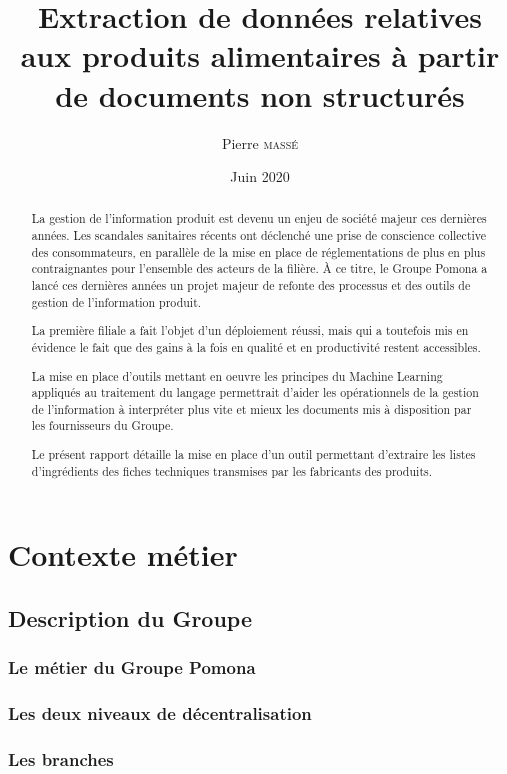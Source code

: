 \documentclass{report}
\title{Extraction de données relatives aux produits alimentaires à partir de documents non structurés}
\author{Pierre \textsc{massé}}
\date{Juin 2020}
\begin{document}
\maketitle

\large
\begin{abstract}
    {\em
    
    La gestion de l'information produit est devenu un enjeu de société majeur ces dernières années.
    Les scandales sanitaires récents ont déclenché une prise de conscience collective des consommateurs, en parallèle de la mise en place de réglementations de plus en plus contraignantes pour l'ensemble des acteurs de la filière\cite{incotext}\cite{incoexpl}.
    \`{A} ce titre, le Groupe Pomona a lancé ces dernières années un projet majeur de refonte des processus et des outils de gestion de l'information produit.

    La première filiale a fait l'objet d'un déploiement réussi, mais qui a toutefois mis en évidence le fait que des gains à la fois en qualité et en productivité restent accessibles.

    La mise en place d'outils mettant en oeuvre les principes du Machine Learning appliqués au traitement du langage permettrait d'aider les opérationnels de la gestion de l'information à interpréter plus vite et mieux les documents mis à disposition par les fournisseurs du Groupe.

    Le présent rapport détaille la mise en place d'un outil permettant d'extraire les listes d'ingrédients des fiches techniques transmises par les fabricants des produits.
    }
\end{abstract}
\normalsize

\tableofcontents

\part{Contexte métier}
    \chapter{Description du Groupe}
        \section{Le métier du Groupe Pomona}
        \section{Les deux niveaux de décentralisation}
        \section{Les branches}
\end{document}
